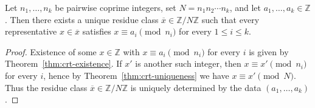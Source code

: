 \begin{corollary}
    \label{cor:crt-unique-class}
    Let $n_1, \ldots, n_k$ be pairwise coprime integers, set
    $N = n_1 n_2 \cdots n_k$, and let $a_1, \ldots, a_k \in \mathbb{Z}$.
    Then there exists a unique residue class $\overline{x} \in \mathbb{Z}/N\mathbb{Z}$
    such that every representative $x \in \overline{x}$ satisfies
    $x \equiv a_i \pmod{n_i}$ for every $1 \leq i \leq k$.
\end{corollary}
\begin{proof}
    Existence of some $x \in \mathbb{Z}$ with $x \equiv a_i \pmod{n_i}$ for
    every $i$ is given by Theorem~\ref{thm:crt-existence}. If $x'$ is another
    such integer, then $x \equiv x' \pmod{n_i}$ for every $i$, hence by
    Theorem~\ref{thm:crt-uniqueness} we have $x \equiv x' \pmod N$. Thus the
    residue class $\overline{x} \in \mathbb{Z}/N\mathbb{Z}$ is uniquely
    determined by the data $(a_1, \ldots, a_k)$.
\end{proof}


